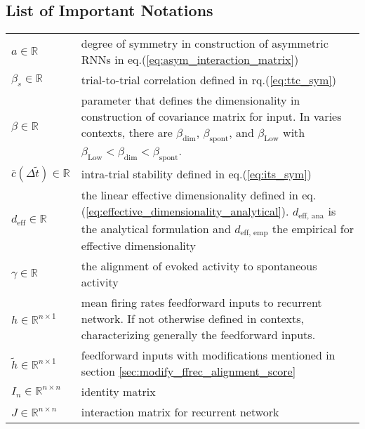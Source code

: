 \documentclass[11pt]{article}
\begin{document}
	\subsection*{List of Important Notations}
	\begin{table}[H]
		\begin{tabularx}{\textwidth}{lX}
			$a \in \mathbb{R}$ & degree of symmetry in construction of asymmetric RNNs in eq.(\ref{eq:asym_interaction_matrix}) \\
			
			$\beta_s \in \mathbb{R}$ & trial-to-trial correlation defined in rq.(\ref{eq:ttc_sym}) \\
			
			$\beta \in \mathbb{R}$ & parameter that defines the dimensionality in construction of covariance matrix for input. In varies contexts, there are $\beta_{\text{dim}}$, $\beta_{\text{spont}}$, and $\beta_{\text{Low}}$ with $\beta_{\text{Low}} < \beta_{\text{dim}} < \beta_{\text{spont}}$.\\
			
			$\bar{c}{(\Delta \tilde{t})} \in \mathbb{R}$ & intra-trial stability defined in eq.(\ref{eq:its_sym}) \\
			
			$d_{\text{eff}} \in \mathbb{R}$ & the linear effective dimensionality defined in eq.(\ref{eq:effective_dimensionality_analytical}). $d_{\text{eff, ana}}$ is the analytical formulation and $d_{\text{eff, emp}}$ the empirical for effective dimensionality \\
			
			$\gamma \in \mathbb{R}$ & the alignment of evoked activity to spontaneous activity\\ %
			
			$h \in \mathbb{R}^{n \times 1}$  & mean firing rates feedforward inputs to recurrent network. If not otherwise defined in contexts, characterizing generally the feedforward inputs.\\
			
			$\tilde{h} \in \mathbb{R}^{n \times 1}$ & feedforward inputs with modifications mentioned in section \ref{sec:modify_ffrec_alignment_score} \\
			
			$I_n \in \mathbb{R}^{n \times n}$ & identity matrix \\
			
			$J \in \mathbb{R}^{n \times n}$  & interaction matrix for recurrent network\\
			

\end{tabularx}
\end{table}
\end{document}
